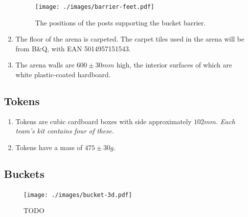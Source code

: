 \begin{enumerate}
  \begin{figure}
    \centering
    \texttt{[image: ./images/barrier-feet.pdf]}
    \caption{The positions of the posts supporting the bucket barrier.}
    \label{fig:bucker-barrier-legs}
  \end{figure}

\item The floor of the arena is carpeted.  The carpet tiles used in the arena will be from B\&Q, with EAN 5014957151543.

\item The arena walls are $600\pm30mm$ high, the interior surfaces of which are white plastic-coated hardboard.
\end{enumerate}

\subsection{Tokens}
\label{sub:Tokens}
\begin {enumerate}
\item Tokens are cubic cardboard boxes with side approximately $102mm$.
\emph{Each team's kit contains four of these.}
\item Tokens have a mass of $475\pm30g$.
\end {enumerate}

\subsection{Buckets}
\label{sub:buckets}
\begin{figure}
  \centering
  \texttt{[image: ./images/bucket-3d.pdf]}
  \caption{TODO}
  \label{fig:bucket-3d}
\end{figure}


\clearpage
